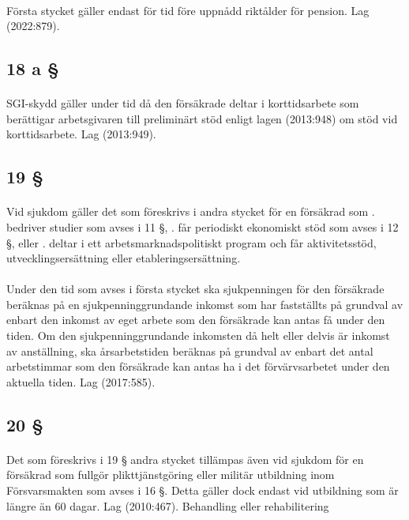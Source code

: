 \documentclass[a4paper,notitlepage,openany,10pt]{book}
\begin{document}
\paragraph*{}
Första stycket gäller endast för tid före uppnådd riktålder för pension.
Lag (2022:879).
\subsection*{18 a §}
\paragraph*{}
SGI-skydd gäller under tid då den försäkrade deltar i korttidsarbete som berättigar arbetsgivaren till preliminärt stöd enligt lagen (2013:948) om stöd vid korttidsarbete.
Lag (2013:949).
\subsection*{19 §}
\paragraph*{}
Vid sjukdom gäller det som föreskrivs i andra stycket för en försäkrad som
. bedriver studier som avses i 11 §,
. får periodiskt ekonomiskt stöd som avses i 12 §, eller
. deltar i ett arbetsmarknadspolitiskt program och får aktivitetsstöd, utvecklingsersättning eller etableringsersättning.
\paragraph*{}
Under den tid som avses i första stycket ska sjukpenningen för den försäkrade beräknas på en sjukpenninggrundande inkomst som har fastställts på grundval av enbart den inkomst av eget arbete som den försäkrade kan antas få under den tiden. Om den sjukpenninggrundande inkomsten då helt eller delvis är inkomst av anställning, ska årsarbetstiden beräknas på grundval av enbart det antal arbetstimmar som den försäkrade kan antas ha i det förvärvsarbetet under den aktuella tiden.
Lag (2017:585).
\subsection*{20 §}
\paragraph*{}
Det som föreskrivs i 19 § andra stycket tillämpas även vid sjukdom för en försäkrad som fullgör plikttjänstgöring eller militär utbildning inom Försvarsmakten som avses i 16 §.
Detta gäller dock endast vid utbildning som är längre än 60 dagar.
Lag (2010:467).
Behandling eller rehabilitering
\end{document}

